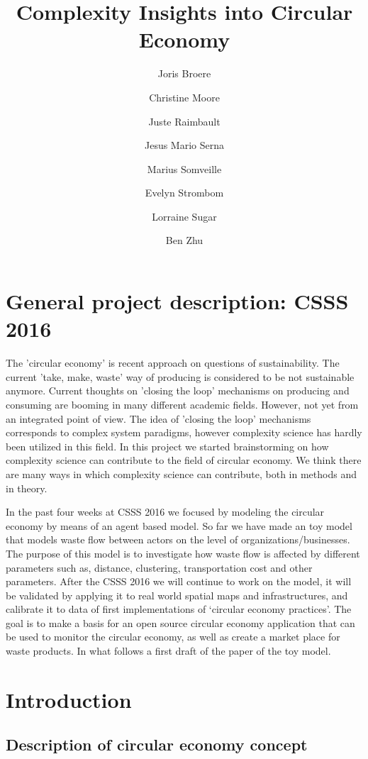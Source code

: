 \documentclass[fleqn,10pt]{wlscirep}
\title{Complexity Insights into Circular Economy}
\author[1]{Joris Broere}
\author[2]{Christine Moore}
\author[3]{Juste Raimbault}
\author[4]{Jesus Mario Serna}
\author[5]{Marius Somveille}
\author[6]{Evelyn Strombom}
\author[7]{Lorraine Sugar}
\author[8]{Ben Zhu}
\affil[1]{Affiliation, department, city, postcode, country}
\affil[2]{Affiliation, department, city, postcode, country}
\affil[*]{corresponding.author@email.example}
\affil[+]{these authors contributed equally to this work}
\begin{document}
\flushbottom
\maketitle

\thispagestyle{empty}


\section*{General project description: CSSS 2016}
The 'circular economy' is recent approach on questions of sustainability. The current 'take, make, waste' way of producing is considered to be not sustainable anymore. Current thoughts on 'closing the loop' mechanisms on producing and consuming are booming in many different academic fields. However, not yet from an integrated point of view. The idea of 'closing the loop' mechanisms corresponds to complex system paradigms, however complexity science has hardly been utilized in this field. In this project we started brainstorming on how complexity science can contribute to the field of circular economy. We think there are many ways in which complexity science can contribute, both in methods and in theory. 

In the past four weeks at CSSS 2016 we focused by modeling the circular economy by means of an agent based model. So far we have made an toy model that models waste flow between actors on the level of organizations/businesses. The purpose of this model is to investigate how waste flow is affected by different parameters such as, distance, clustering, transportation cost and other parameters. After the CSSS 2016 we will continue to work on the model, it will be validated by applying it to real world spatial maps and infrastructures, and calibrate it to data of first implementations of `circular economy practices'. The goal is to make a basis for an open source circular economy application that can be used to monitor the circular economy, as well as create a market place for waste products. In what follows a first draft of the paper of the toy model.



\section{Introduction}


\subsection{Description of circular economy concept}
\end{document}
